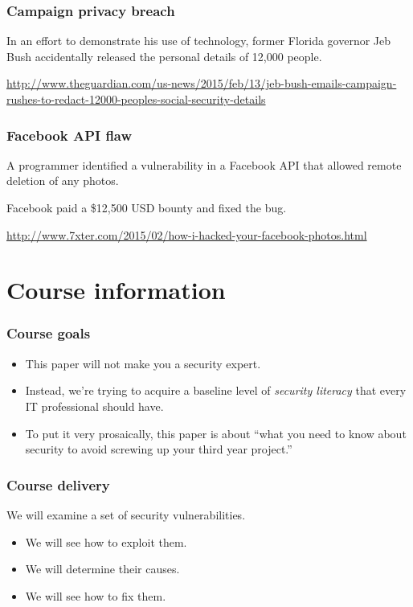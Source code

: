 \documentclass[10pt]{beamer}
\begin{document}
\begin{frame}
	\frametitle{Campaign privacy breach}

	In an effort to demonstrate his use of technology, former
	Florida governor Jeb Bush accidentally released the personal
	details of 12,000 people.

	\vspace{10mm}
	\url{http://www.theguardian.com/us-news/2015/feb/13/jeb-bush-emails-campaign-rushes-to-redact-12000-peoples-social-security-details}

\end{frame}

\begin{frame}
	\frametitle{Facebook API flaw}

	A programmer identified a vulnerability in a Facebook API
	that allowed remote deletion of any photos.

	\vspace{10mm}
	Facebook paid a \$12,500 USD bounty and fixed the bug.

	\vspace{10mm}
	\url{http://www.7xter.com/2015/02/how-i-hacked-your-facebook-photos.html}
\end{frame}
\section{Course information}
\begin{frame}
  \frametitle{Course goals}

 \begin{itemize}
  \item This paper will not make you a security expert.
  \item Instead, we're trying to acquire a baseline level of \emph{security literacy}
	  that every IT professional should have.
  \item To put it very prosaically, this paper is about ``what you need to 
	  know about security to avoid screwing up your third year project.''
  \end{itemize}
\end{frame}

\begin{frame}
	\frametitle{Course delivery}
	
	We will examine a set of security vulnerabilities.
	
	\begin{itemize}
		\item We will see how to exploit them.
		\item We will determine their causes.
		\item We will see how to fix them.
	\end{itemize}
\end{frame}
\end{document}
